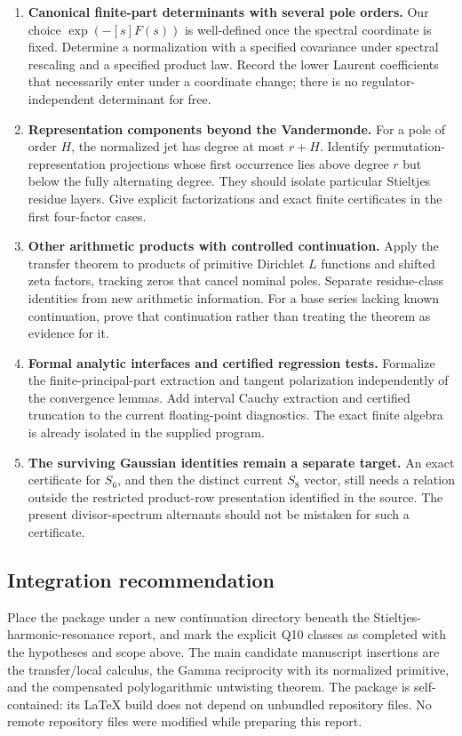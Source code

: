 \documentclass[11pt]{article}
\numberwithin{equation}{section}
\theoremstyle{definition}\newtheorem{definition}[theorem]{Definition}
\theoremstyle{remark}\newtheorem{remark}[theorem]{Remark}\newtheorem{example}[theorem]{Example}
\begin{document}
\begin{enumerate}[leftmargin=*,label=\textbf{Q\arabic*.},itemsep=7pt]
\item \textbf{Canonical finite-part determinants with several pole orders.}
Our choice $\exp(-[s]F(s))$ is well-defined once the spectral coordinate
is fixed. Determine a normalization with a specified covariance under
spectral rescaling and a specified product law. Record the lower
Laurent coefficients that necessarily enter under a coordinate change;
there is no regulator-independent determinant for free.

\item \textbf{Representation components beyond the Vandermonde.}
For a pole of order $H$, the normalized jet has degree at most $r+H$.
Identify permutation-representation projections whose first occurrence
lies above degree $r$ but below the fully alternating degree. They should
isolate particular Stieltjes residue layers. Give explicit factorizations
and exact finite certificates in the first four-factor cases.

\item \textbf{Other arithmetic products with controlled continuation.}
Apply the transfer theorem to products of primitive Dirichlet $L$
functions and shifted zeta factors, tracking zeros that cancel nominal
poles. Separate residue-class identities from new arithmetic information.
For a base series lacking known continuation, prove that continuation
rather than treating the theorem as evidence for it.

\item \textbf{Formal analytic interfaces and certified regression tests.}
Formalize the finite-principal-part extraction and tangent polarization
independently of the convergence lemmas. Add interval Cauchy extraction
and certified truncation to the current floating-point diagnostics.
The exact finite algebra is already isolated in the supplied program.

\item \textbf{The surviving Gaussian identities remain a separate target.}
An exact certificate for $S_6$, and then the distinct current $S_8$
vector, still needs a relation outside the restricted product-row
presentation identified in the source. The present divisor-spectrum
alternants should not be mistaken for such a certificate.
\end{enumerate}

\subsection{Integration recommendation}
Place the package under a new continuation directory beneath the
Stieltjes-harmonic-resonance report, and mark the explicit Q10 classes
as completed with the hypotheses and scope above. The main candidate
manuscript insertions are the transfer/local calculus, the Gamma
reciprocity with its normalized primitive, and the compensated
polylogarithmic untwisting theorem. The package is self-contained:
its \LaTeX{} build does not depend on unbundled repository files.
No remote repository files were modified while preparing this report.
\end{document}
